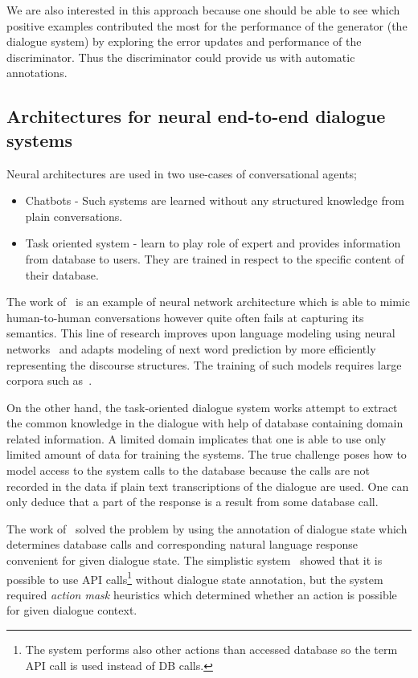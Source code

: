 \documentclass[11pt]{article}
\begin{document}
We are also interested in this approach because one should be able to see which positive examples contributed the most for the performance of the generator (the dialogue system) by exploring the error updates and performance of the discriminator.
Thus the discriminator could provide us with automatic annotations. 

\subsection{Architectures for neural end-to-end dialogue systems}
\label{sub:nn_architectures}
Neural architectures are used in two use-cases of conversational agents;
\begin{itemize}
    \item Chatbots - Such systems are learned without any structured knowledge from plain conversations.
    \item Task oriented system - learn to play role of expert and provides information from database to users.
        They are trained in respect to the specific content of their database.
\end{itemize}

The work of~\cite{serban_multiresolution_2016} is an example of neural network architecture which is able to mimic human-to-human conversations however quite often fails at capturing its semantics.
This line of research improves upon language modeling using neural networks~\cite{mikolov_efficient_2013} and adapts modeling of next word prediction by more efficiently representing the discourse structures.
The training of such models requires large corpora such as~\cite{lowe_ubuntu_2015}. 

On the other hand, the task-oriented dialogue system works attempt to extract the common knowledge in the dialogue with help of database containing domain related information.
A limited domain implicates that one is able to use only limited amount of data for training the systems.
The true challenge poses how to model access to the system calls to the database because the calls are not recorded in the data if plain text transcriptions of the dialogue are used.
One can only deduce that a part of the response is a result from some database call.

The work of~\cite{wen_networkbased_2016} solved the problem by using the annotation of dialogue state which determines database calls and corresponding natural language response convenient for given dialogue state. 
The simplistic system~\cite{williams2016end} showed that it is possible to use API calls\footnote{The system performs also other actions than accessed database so the term API call is used instead of DB calls.} without dialogue state annotation, but the system required {\it action mask} heuristics which determined whether an action is possible for given dialogue context.
\end{document}
